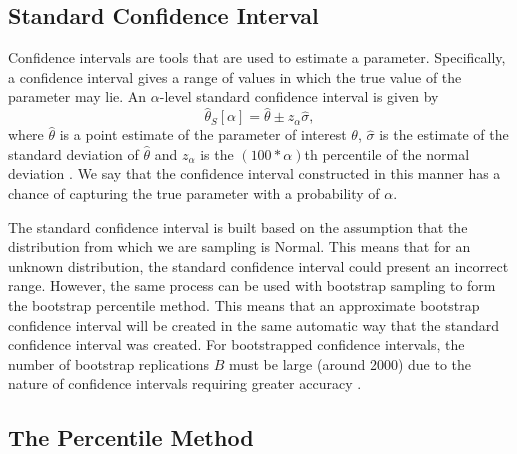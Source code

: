 \documentclass[12pt]{article}
\begin{document}
\hypertarget{standard-confidence-interval}{%
\subsection{Standard Confidence
Interval}\label{standard-confidence-interval}}

Confidence intervals are tools that are used to estimate a parameter.
Specifically, a confidence interval gives a range of values in which the
true value of the parameter may lie. An \(\alpha\)-level standard
confidence interval is given by
\[\hat{\theta}_S[\alpha] = \hat{\theta} \pm z_{\alpha}\hat{\sigma},\]
where \(\hat{\theta}\) is a point estimate of the parameter of interest
\(\theta\), \(\hat{\sigma}\) is the estimate of the standard deviation
of \(\hat{\theta}\) and \(z_{\alpha}\) is the \((100 *\alpha)\)th
percentile of the normal deviation \citep{Efron86}. We say that the
confidence interval constructed in this manner has a chance of capturing
the true parameter with a probability of \(\alpha\).

The standard confidence interval is built based on the assumption that
the distribution from which we are sampling is Normal. This means that
for an unknown distribution, the standard confidence interval could
present an incorrect range. However, the same process can be used with
bootstrap sampling to form the bootstrap percentile method. This means
that an approximate bootstrap confidence interval will be created in the
same automatic way that the standard confidence interval was created.
For bootstrapped confidence intervals, the number of bootstrap
replications \(B\) must be large (around 2000) due to the nature of
confidence intervals requiring greater accuracy \citep{Efron86}.

\hypertarget{the-percentile-method}{%
\subsection{The Percentile Method}\label{the-percentile-method}}
\end{document}
